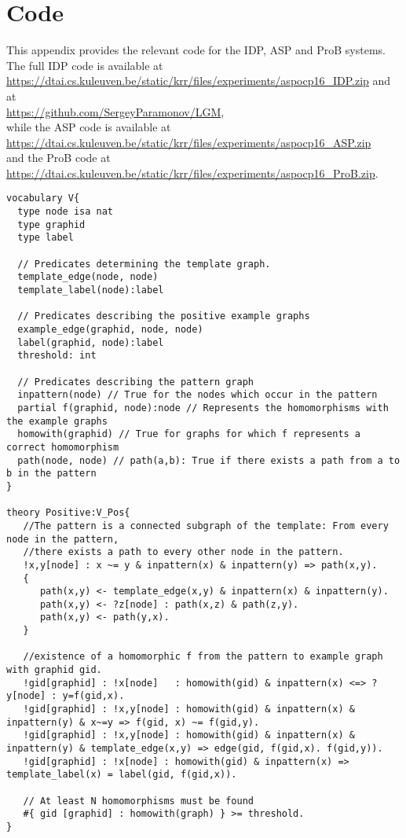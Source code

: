 \section{Code}
\label{app:Code}
This appendix provides the relevant code for the IDP, ASP and ProB systems.
The full IDP code is available at\\ \url{https://dtai.cs.kuleuven.be/static/krr/files/experiments/aspocp16_IDP.zip} and at \\\url{https://github.com/SergeyParamonov/LGM},\\ while the ASP code is available at\\ \url{https://dtai.cs.kuleuven.be/static/krr/files/experiments/aspocp16_ASP.zip}\\ and the ProB code at \\\url{https://dtai.cs.kuleuven.be/static/krr/files/experiments/aspocp16_ProB.zip}. 
\begin{lstlisting}[caption=IDP positive constraint, style=model, label=lst:IDPPos]
vocabulary V{
  type node isa nat
  type graphid
  type label

  // Predicates determining the template graph.
  template_edge(node, node) 
  template_label(node):label

  // Predicates describing the positive example graphs
  example_edge(graphid, node, node)
  label(graphid, node):label
  threshold: int

  // Predicates describing the pattern graph
  inpattern(node) // True for the nodes which occur in the pattern
  partial f(graphid, node):node // Represents the homomorphisms with the example graphs
  homowith(graphid) // True for graphs for which f represents a correct homomorphism
  path(node, node) // path(a,b): True if there exists a path from a to b in the pattern
}

theory Positive:V_Pos{
   //The pattern is a connected subgraph of the template: From every node in the pattern, 
   //there exists a path to every other node in the pattern.
   !x,y[node] : x ~= y & inpattern(x) & inpattern(y) => path(x,y).
   {
      path(x,y) <- template_edge(x,y) & inpattern(x) & inpattern(y).
      path(x,y) <- ?z[node] : path(x,z) & path(z,y).
      path(x,y) <- path(y,x).
   }

   //existence of a homomorphic f from the pattern to example graph with graphid gid.
   !gid[graphid] : !x[node]   : homowith(gid) & inpattern(x) <=> ? y[node] : y=f(gid,x).
   !gid[graphid] : !x,y[node] : homowith(gid) & inpattern(x) & inpattern(y) & x~=y => f(gid, x) ~= f(gid,y).
   !gid[graphid] : !x,y[node] : homowith(gid) & inpattern(x) & inpattern(y) & template_edge(x,y) => edge(gid, f(gid,x). f(gid,y)).
   !gid[graphid] : !x[node] : homowith(gid) & inpattern(x) => template_label(x) = label(gid, f(gid,x)).

   // At least N homomorphisms must be found
   #{ gid [graphid] : homowith(graph) } >= threshold.
}
\end{lstlisting}


